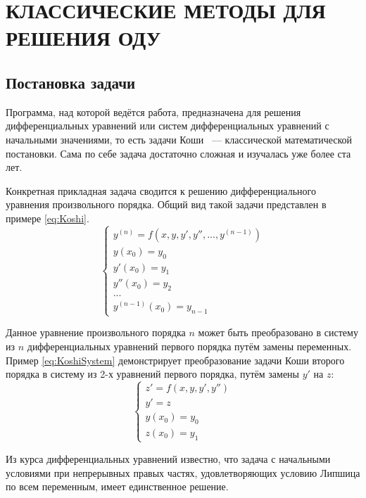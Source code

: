 \section{КЛАССИЧЕСКИЕ МЕТОДЫ ДЛЯ РЕШЕНИЯ ОДУ}

\subsection{Постановка задачи}

Программа, над которой ведётся работа, предназначена для решения дифференциальных уравнений или систем дифференциальных 
уравнений с начальными значениями, то есть задачи Коши ~--- классической математической постановки. 
Сама по себе задача достаточно сложная и изучалась уже более ста лет.

Конкретная прикладная задача сводится к решению дифференциального уравнения произвольного порядка. Общий вид такой задачи представлен
в примере \ref{eq:Koshi}.
\begin{equation}
    \begin{cases}
        y^{(n)} = f(x, y, y', y'', ..., y^{(n - 1)})\\
        y(x_0) = y_0\\
        y'(x_0) = y_1\\
        y''(x_0) = y_2\\
        ...\\
        y^{(n - 1)}(x_0) = y_{n - 1}
    \end{cases}
    \label{eq:Koshi}
\end{equation}

Данное уравнение произвольного порядка $n$ может быть преобразовано в систему из $n$ дифференциальных уравнений первого порядка путём
замены переменных. Пример \ref{eq:KoshiSystem} демонстрирует преобразование задачи Коши второго порядка в систему из 2-х уравнений
первого порядка, путём замены $y'$ на $z$:
\begin{equation}
    \begin{cases}
        z' = f(x, y, y', y'')\\
        y' = z\\
        y(x_0) = y_0\\
        z(x_0) = y_1
    \end{cases}
    \label{eq:KoshiSystem}
\end{equation}

Из курса дифференциальных уравнений известно, что задача с начальными условиями при непрерывных правых частях, удовлетворяющих условию
Липшица по всем переменным, имеет единственное решение.

